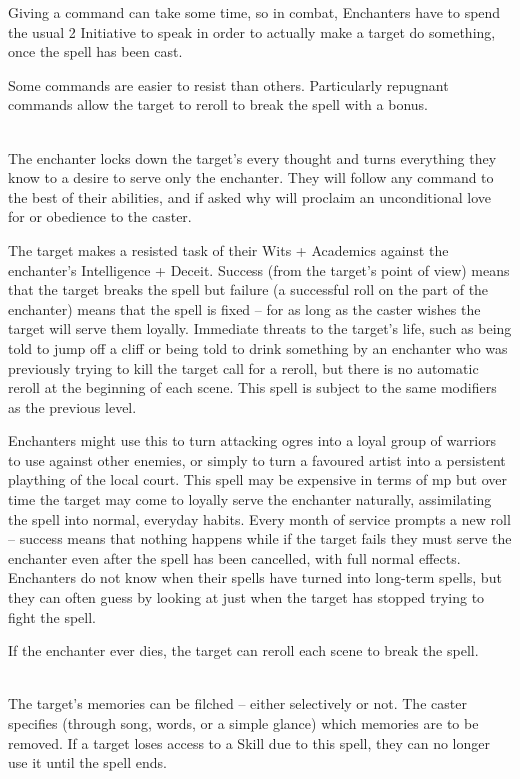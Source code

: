 \begin{multicols}{2}

\noindent
Giving a command can take some time, so in combat, Enchanters have to spend the usual 2 Initiative to speak in order to actually make a target do something, once the spell has been cast.

Some commands are easier to resist than others. Particularly repugnant commands allow the target to reroll to break the spell with a bonus.

\spelllevel

\\
The enchanter locks down the target's every thought and turns everything they know to a desire to serve only the enchanter. They will follow any command to the best of their abilities, and if asked why will proclaim an unconditional love for or obedience to the caster.

The target makes a resisted task of their Wits + Academics against the enchanter's Intelligence + Deceit.
Success (from the target's point of view) means that the target breaks the spell but failure (a successful roll on the part of the enchanter) means that the spell is fixed -- for as long as the caster wishes the target will serve them loyally.
Immediate threats to the target's life, such as being told to jump off a cliff or being told to drink something by an enchanter who was previously trying to kill the target call for a reroll, but there is no automatic reroll at the beginning of each scene.
This spell is subject to the same modifiers as the previous level.

Enchanters might use this to turn attacking ogres into a loyal group of warriors to use against other enemies, or simply to turn a favoured artist into a persistent plaything of the local court. This spell may be expensive in terms of \gls{mp} but over time the target may come to loyally serve the enchanter naturally, assimilating the spell into normal, everyday habits. Every month of service prompts a new roll -- success means that nothing happens while if the target fails they must serve the enchanter even after the spell has been cancelled, with full normal effects. Enchanters do not know when their spells have turned into long-term spells, but they can often guess by looking at just when the target has stopped trying to fight the spell.

If the enchanter ever dies, the target can reroll each scene to break the spell.

\\
The target's memories can be filched -- either selectively or not. The caster specifies (through song, words, or a simple glance) which memories are to be removed. If a target loses access to a Skill due to this spell, they can no longer use it until the spell ends.


\end{multicols}
